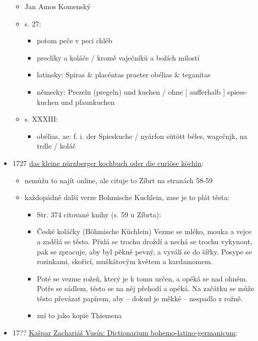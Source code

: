 \begin{itemize}
  \begin{itemize}
  \tightlist
  \item
    Jan Amos Komenský
  \item
    s. 27:

    \begin{itemize}
    \tightlist
    \item
      potom peče v peci chléb
    \item
      preclíky a koláče / kromě vaječníků a božích milostí
    \item
      latinsky: Spiras \& placéntas praeter obélias \& teganitas
    \item
      německy: Prezeln (pregeln) und kuchen / ohne {[} aufferhalb {]}
      spiess-kuchen und pfaunkuchen
    \end{itemize}
  \item
    s. XXXIII:

    \begin{itemize}
    \tightlist
    \item
      obélias, ae: f. i. der Spieskuche / nyárfon sütött béles,
      wagečnjk, na trdle / koláč
    \end{itemize}
  \end{itemize}
\item
  1727
  \href{https://ndk.cz/uuid/uuid:b59a1ff0-9f23-11ea-b6e0-005056827e51}{das
  kleine nürnberger kochbuch oder die curiöse köchin}:

  \begin{itemize}
  \tightlist
  \item
    nemůžu to najít online, ale cituje to Zíbrt na stranách 58-59
  \item
    každopádně další verze Bohmische Kuchlein, zase je to plát těsta:

    \begin{itemize}
    \tightlist
    \item
      Str. 374 citované knihy (s. 59 u Zíbrta):
    \item
      České koláčky (Böhmische Küchlein) Vezme se mléko, mouka a vejce a
      zadělá se těsto. Přidá se trochu droždí a nechá se trochu
      vykynout, pak se zpracuje, aby byl pěkně pevný, a vyválí se do
      šířky. Posype se rozinkami, skořicí, muškátovým květem a
      kardamomem.
    \item
      Poté se vezme rožeň, který je k tomu určen, a opéká se nad ohněm.
      Potře se sádlem, těsto se na něj přehodí a opéká. Na začátku se
      může těsto převázat papírem, aby -- dokud je měkké -- nespadlo z
      rožně.
    \item
      zní to jako kopie Thiemena
    \end{itemize}
  \end{itemize}
\item
  17??
  \href{https://bara.ujc.cas.cz/slovniky/VusSlovBLG1729/vusin22.html\#CTX14944}{Kašpar
  Zachariáš Vusín: Dictionarium bohemo-latino-germanicum}:


\end{itemize}
